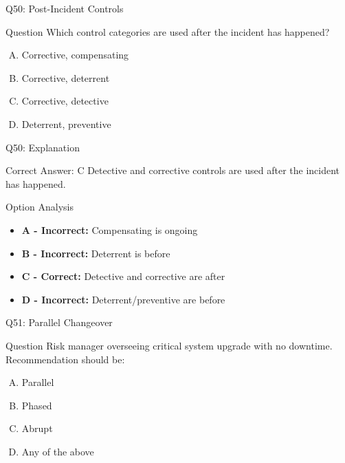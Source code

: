 \documentclass{beamer}
\begin{document}
	\begin{frame}{Q50: Post-Incident Controls}
		\begin{block}{Question}
			Which control categories are used after the incident has happened?
		\end{block}
		\begin{enumerate}[(A)]
			\item Corrective, compensating
			\item Corrective, deterrent
			\item Corrective, detective
			\item Deterrent, preventive
		\end{enumerate}
	\end{frame}
	
	\begin{frame}{Q50: Explanation}
		\begin{block}{Correct Answer: C}
			Detective and corrective controls are used after the incident has happened.
		\end{block}
		\begin{block}{Option Analysis}
			\begin{itemize}
				\item \textbf{A - Incorrect:} Compensating is ongoing
				\item \textbf{B - Incorrect:} Deterrent is before
				\item \textbf{C - Correct:} Detective and corrective are after
				\item \textbf{D - Incorrect:} Deterrent/preventive are before
			\end{itemize}
		\end{block}
	\end{frame}
	
	\begin{frame}{Q51: Parallel Changeover}
		\begin{block}{Question}
			Risk manager overseeing critical system upgrade with no downtime. Recommendation should be:
		\end{block}
		\begin{enumerate}[(A)]
			\item Parallel
			\item Phased
			\item Abrupt
			\item Any of the above
		\end{enumerate}
	\end{frame}
	
\end{document}
